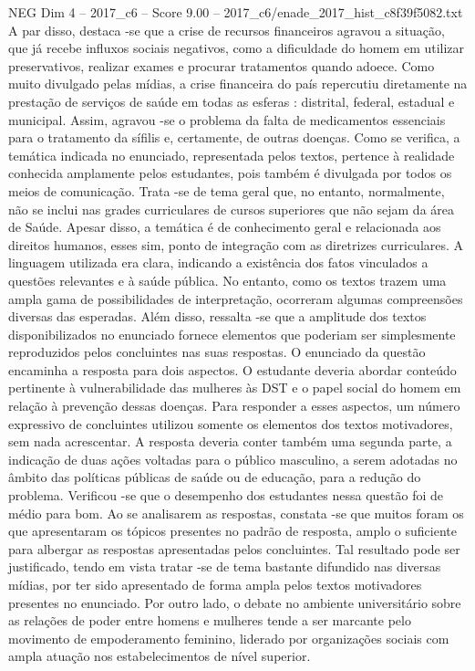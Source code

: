 \begin{textsample}{NEG Dim 4 – 2017\_c6 – Score 9.00 – 2017\_c6/enade\_2017\_hist\_c8f39f5082.txt}
A par disso, destaca -se que a crise de recursos financeiros agravou a situação, que já recebe influxos sociais negativos, como a dificuldade do homem em utilizar preservativos, realizar exames e procurar tratamentos quando adoece.
Como muito divulgado pelas mídias, a crise financeira do país repercutiu diretamente na prestação de serviços de saúde em todas as esferas : distrital, federal, estadual e municipal.
Assim, agravou -se o problema da falta de medicamentos essenciais para o tratamento da sífilis e, certamente, de outras doenças.
Como se verifica, a temática indicada no enunciado, representada pelos textos, pertence à realidade conhecida amplamente pelos estudantes, pois também é divulgada por todos os meios de comunicação.
Trata -se de tema geral que, no entanto, normalmente, não se inclui nas grades curriculares de cursos superiores que não sejam da área de Saúde.
Apesar disso, a temática é de conhecimento geral e relacionada aos direitos humanos, esses sim, ponto de integração com as diretrizes curriculares.
A linguagem utilizada era clara, indicando a existência dos fatos vinculados a questões relevantes e à saúde pública.
No entanto, como os textos trazem uma ampla gama de possibilidades de interpretação, ocorreram algumas compreensões diversas das esperadas.
Além disso, ressalta -se que a amplitude dos textos disponibilizados no enunciado fornece elementos que poderiam ser simplesmente reproduzidos pelos concluintes nas suas respostas.
O enunciado da questão encaminha a resposta para dois aspectos.
O estudante deveria abordar conteúdo pertinente à vulnerabilidade das mulheres às DST e o papel social do homem em relação à prevenção dessas doenças.
Para responder a esses aspectos, um número expressivo de concluintes utilizou somente os elementos dos textos motivadores, sem nada acrescentar.
A resposta deveria conter também uma segunda parte, a indicação de duas ações voltadas para o público masculino, a serem adotadas no âmbito das políticas públicas de saúde ou de educação, para a redução do problema.
Verificou -se que o desempenho dos estudantes nessa questão foi de médio para bom.
Ao se analisarem as respostas, constata -se que muitos foram os que apresentaram os tópicos presentes no padrão de resposta, amplo o suficiente para albergar as respostas apresentadas pelos concluintes.
Tal resultado pode ser justificado, tendo em vista tratar -se de tema bastante difundido nas diversas mídias, por ter sido apresentado de forma ampla pelos textos motivadores presentes no enunciado.
Por outro lado, o debate no ambiente universitário sobre as relações de poder entre homens e mulheres tende a ser marcante pelo movimento de empoderamento feminino, liderado por organizações sociais com ampla atuação nos estabelecimentos de nível superior.

\end{textsample}
